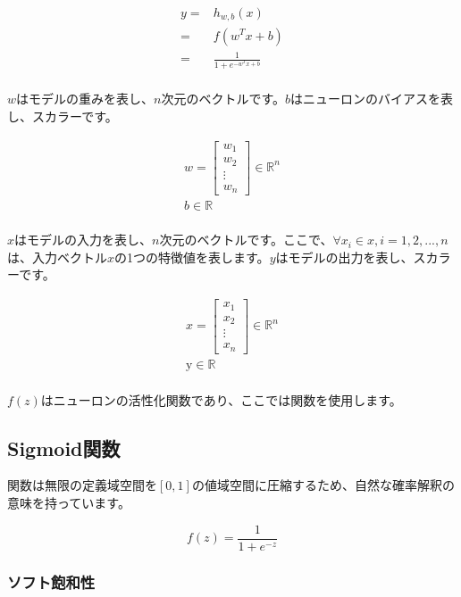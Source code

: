 \begin{content}
\[\begin{aligned}
  y =  & {h_{w,b}}(x) \\ 
   =  & f({w^T}x + b) \\ 
   =  & \frac{1}{{1 + {e^{ - {w^T}x + b}}}} \\ 
\end{aligned} \]

$w$はモデルの重みを表し、$n$次元のベクトルです。$b$はニューロンのバイアスを表し、スカラーです。

\[\begin{gathered}
  w = \left[ {\begin{array}{*{20}{c}}
  {{w_1}} \\ 
  {{w_2}} \\ 
   \vdots  \\ 
  {{w_n}} 
\end{array}} \right] \in {\mathbb{R}^n} \\ 
  b \in \mathbb{R} \\ 
\end{gathered} \]

$x$はモデルの入力を表し、$n$次元のベクトルです。ここで、$\forall {x_i} \in x,i = 1,2,...,n$は、入力ベクトル$x$の1つの特徴値を表します。$y$はモデルの出力を表し、スカラーです。

\[\begin{gathered}
  x = \left[ {\begin{array}{*{20}{c}}
  {{x_1}} \\ 
  {{x_2}} \\ 
   \vdots  \\ 
  {{x_n}} 
\end{array}} \right] \in {\mathbb{R}^n} \\ 
  {\text{y}} \in {\mathbb{R}} \\ 
\end{gathered}\]

$f(z)$はニューロンの活性化関数であり、ここでは関数を使用します。

\subsection{Sigmoid関数}

関数は無限の定義域空間を$[0, 1]$の値域空間に圧縮するため、自然な確率解釈の意味を持っています。

\[
f(z) = \frac{1}{{1 + {e^{ - z}}}}
\]

\subsubsection{ソフト飽和性}


\end{content}
